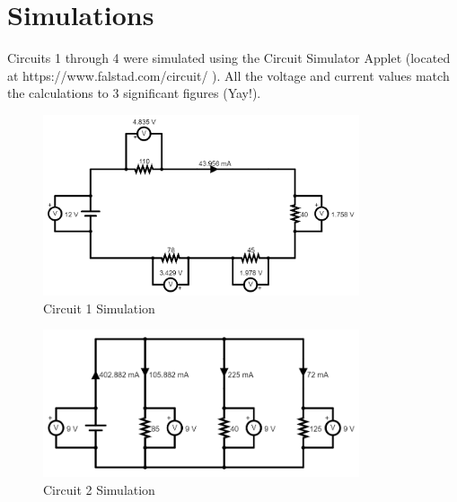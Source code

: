 \documentclass[12pt]{iopart} %
\begin{document}
\section{Simulations}

Circuits 1 through 4 were simulated using the Circuit Simulator Applet (located at https://www.falstad.com/circuit/ ).
All the voltage and current values match the calculations to 3 significant figures (Yay!).

\begin{figure}[htbp]
  \begin{indented}
  \item[]\includegraphics[width=0.83\textwidth]{circuit-1-simulation.png}
  \end{indented}
  \caption{\label{fig:circuit_1_simulation}
  Circuit 1 Simulation
  }
\end{figure}

\begin{figure}[htbp]
  \begin{indented}
  \item[]\includegraphics[width=0.83\textwidth]{circuit-2-simulation.png}
  \end{indented}
  \caption{\label{fig:circuit_2_simulation}
  Circuit 2 Simulation
  }
\end{figure}
\end{document}
